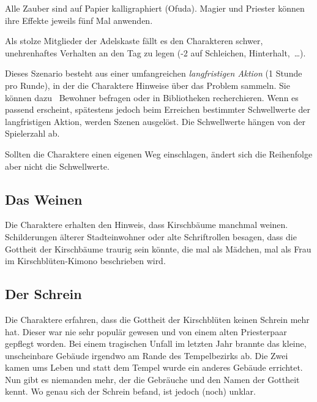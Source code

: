 {		\noindent
		Alle Zauber sind auf Papier kalligraphiert (Ofuda). Magier und Priester können ihre Effekte jeweils fünf Mal anwenden.

		Als stolze Mitglieder der Adelskaste fällt es den Charakteren schwer, unehrenhaftes Verhalten an den Tag zu legen (-2 auf Schleichen, Hinterhalt,~\ldots).


		\noindent
		Dieses Szenario besteht aus einer umfangreichen \emph{langfristigen Aktion} (1 Stunde pro Runde), in der die Charaktere Hinweise über das Problem sammeln. Sie können dazu \zB\ Bewohner befragen oder in Bibliotheken recherchieren. Wenn es passend erscheint, spätestens jedoch beim Erreichen bestimmter Schwellwerte der langfristigen Aktion, werden Szenen ausgelöst. Die Schwellwerte hängen von der Spielerzahl ab.


		\noindent
		Sollten die Charaktere einen eigenen Weg einschlagen, ändert sich die Reihenfolge aber nicht die Schwellwerte.

		\subsection{Das Weinen}

			Die Charaktere erhalten den Hinweis, dass Kirschbäume manchmal weinen. Schilderungen älterer Stadteinwohner oder alte Schriftrollen besagen, dass die Gottheit der Kirschbäume traurig sein könnte, die mal als Mädchen, mal als Frau im Kirschblüten-Kimono beschrieben wird.

		\subsection{Der Schrein}

			Die Charaktere erfahren, dass die Gottheit der Kirschblüten keinen Schrein mehr hat. Dieser war nie sehr populär gewesen und von einem alten Priesterpaar gepflegt worden. Bei einem tragischen Unfall im letzten Jahr brannte das kleine, unscheinbare Gebäude irgendwo am Rande des Tempelbezirks ab. Die Zwei kamen ums Leben und statt dem Tempel wurde ein anderes Gebäude errichtet. Nun gibt es niemanden mehr, der die Gebräuche und den Namen der Gottheit kennt. Wo genau sich der Schrein befand, ist jedoch (noch) unklar.

}
